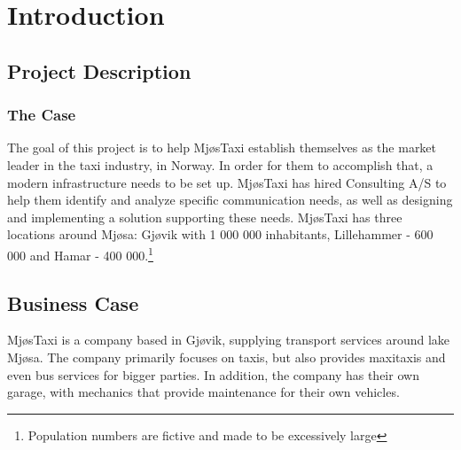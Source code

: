 \chapter{Introduction}
\label{chap:introduction}

\section{Project Description}

\subsection*{The Case}


The goal of this project is to help MjøsTaxi establish themselves as the market leader in the taxi industry, in Norway. In order for them to accomplish that, a modern infrastructure needs to be set up. MjøsTaxi has hired Consulting A/S to help them identify and analyze specific communication needs, as well as designing and implementing a solution supporting these needs. MjøsTaxi has three locations around Mjøsa: Gjøvik with 1 000 000 inhabitants, Lillehammer - 600 000 and Hamar - 400 000.\footnote{Population numbers are fictive and made to be excessively large}



    
\section{Business Case}
MjøsTaxi is a company based in Gjøvik, supplying transport services around lake Mjøsa. 
The company primarily focuses on taxis, but also provides maxitaxis and even bus services for bigger parties.
In addition, the company has their own garage, with mechanics that provide maintenance for their own vehicles.

